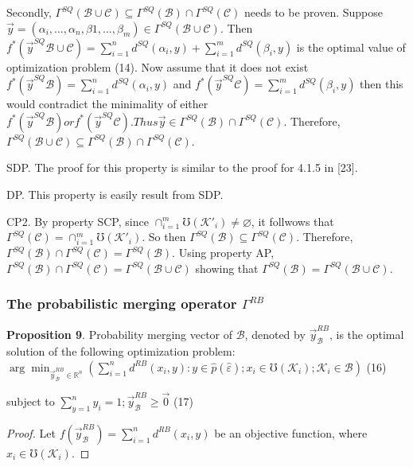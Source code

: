 \documentclass[]{iosart2c}
\begin{document}
    Secondly, $\Gamma^{SQ}(\mathcal{B} \cup \mathcal{C}) \subseteq \Gamma^{SQ}(\mathcal{B}) \cap \Gamma^{SQ}(\mathcal{C})$ needs to be proven. Suppose $\vec{y} = (\alpha_i, ..., \alpha_n, \beta1, ..., \beta_m) \in \Gamma^{SQ}(\mathcal{B} \cup \mathcal{C})$. Then $f^*(\vec{y}^{SQ}\mathcal{B}\cup\mathcal{C})=\sum^n_{i=1} d^{SQ} (\alpha_i, y) +\sum^m_{i=1} d^{SQ}(\beta_i, y)$ is the optimal value of optimization problem (14). Now assume that it does not exist $f^*(\vec{y}^{SQ}\mathcal{B} ) = \sum^n_{i=1} d^{SQ}(\alpha_i, y)$ and $f^*(\vec{y}^{SQ}\mathcal{C} ) = \sum^m_{i=1} d^{SQ}(\beta_i, y)$ then this would contradict the minimality of either $f^*(\vec{y}^{SQ}\mathcal{B} ) or f^*(\vec{y}^{SQ}\mathcal{C} ). Thus \vec{y} \in \Gamma^{SQ}(\mathcal{B}) \cap \Gamma^{SQ}(\mathcal{C})$. Therefore, $\Gamma^{SQ}(\mathcal{B} \cup \mathcal{C}) \subseteq \Gamma^{SQ}(\mathcal{B}) \cap \Gamma^{SQ}(\mathcal{C})$.

    SDP. The proof for this property is similar to the proof for 4.1.5 in [23].

    DP. This property is easily result from SDP.

    CP2. By property SCP, since $\cap^m_{i=1}\mho(\mathcal{K}'_i) \neq \varnothing$,
    it follwows that $\Gamma^{SQ}(\mathcal{C}) = \cap^m_{i=1}\mho(\mathcal{K}'_i)$. So then
    $\Gamma^{SQ}(\mathcal{B}) \subseteq \Gamma^{SQ}(\mathcal{C})$. Therefore, $\Gamma^{SQ}(\mathcal{B}) \cap \Gamma^{SQ}(\mathcal{C}) =
    \Gamma^{SQ}(\mathcal{B})$. Using property AP, $\Gamma^{SQ}(\mathcal{B}) \cap \Gamma^{SQ}(\mathcal{C}) = \Gamma^{SQ}(\mathcal{B} \cup \mathcal{C})$
    showing that $\Gamma^{SQ}(\mathcal{B}) = \Gamma^{SQ}(\mathcal{B} \cup \mathcal{C})$.

    \subsubsection{The probabilistic merging operator $\Gamma ^{RB}$}
    \textbf{Proposition 9}. Probability merging vector of $\mathcal{B}$,
    denoted by $\vec{y}^{RB}_\mathcal{B}$, is the optimal solution of the following optimization problem:
    $\arg \min_{\vec{y}^{RB}_\mathcal{B} \in \mathbb{R}^n} \left( \sum^n_{i=1} d^{RB}(x_i, y) :
    y \in \hat{p}(\hat{\varepsilon}); x_i \in \mho(\mathcal{K}_i);\mathcal{K}_i \in \mathcal{B} \right)$  (16)

    subject to $\sum^n_{y=1} y_i= 1; \vec{y}^{RB}_\mathcal{B} \geq \vec{0}$ (17)

    \begin{proof}
        Let $f(\vec{y}^{RB}_\mathcal{B}) = \sum^n_{i=1} d^{RB}(x_i,y)$ be an objective function, where $x_i \in \mho(\mathcal{K}_i)$.
    \end{proof}
\end{document}
